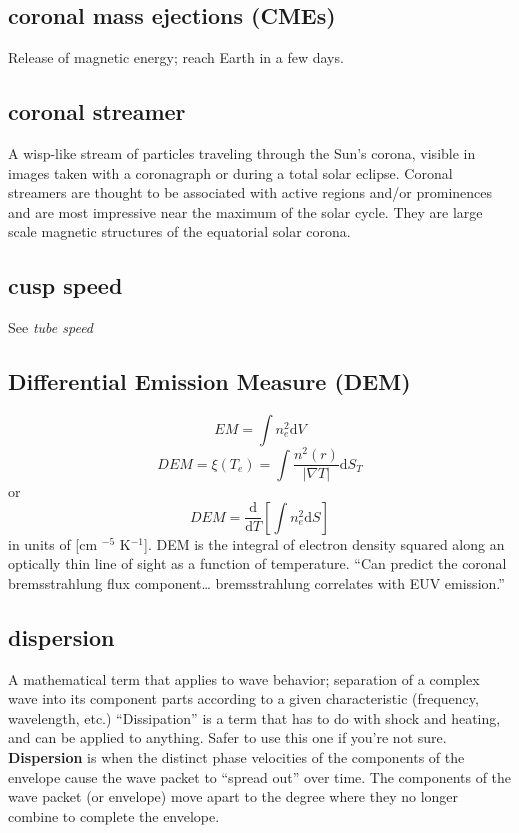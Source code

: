 \documentclass{article}
\begin{document}
\subsection{coronal mass ejections (CMEs)}
Release of magnetic energy; reach Earth in a few days.

\subsection{coronal streamer}
A wisp-like stream of particles traveling through the Sun's corona,
visible in images taken with a coronagraph or during a total solar eclipse. Coronal
streamers are thought to be associated with active regions and/or
prominences and are most impressive near the maximum of the solar cycle.
They are large scale magnetic structures of the equatorial solar corona.

\subsection{cusp speed}
See \emph{tube speed}

\subsection{Differential Emission Measure (DEM)}
\[
    EM = \int{n_{e}^{2}\mathrm{d}V}
    \]
\[
    DEM = \xi(T_{e}) = \int{\frac{n^{2}(r)}{|\nabla{T}|}\mathrm{d}S_{T}}
    \]
or
\[
    DEM = \frac{\mathrm{d}}{\mathrm{d}T}\left[\int{n_{e}^{2}\mathrm{d}S}\right]
    \]
in units of [cm ${^{-5}}$ K${^{-1}}$]. DEM is the integral of electron
density squared along an optically thin line of sight as a function of
temperature.
``Can predict the coronal bremsstrahlung flux component\ldots
bremsstrahlung correlates with EUV emission.''

\subsection{dispersion}
A mathematical term that applies to wave behavior; separation of a complex
wave into its component parts according to a given characteristic
(frequency, wavelength, etc.) ``Dissipation'' is a term that has to do with
shock and heating, and can be applied to anything. Safer to use this one
if you're not sure.
\textbf{Dispersion} is when the distinct phase velocities of the components of the
envelope cause the wave packet to ``spread out'' over time.
The components of the wave packet (or envelope) move apart to the degree
where they no longer combine to complete the envelope.
\end{document}
